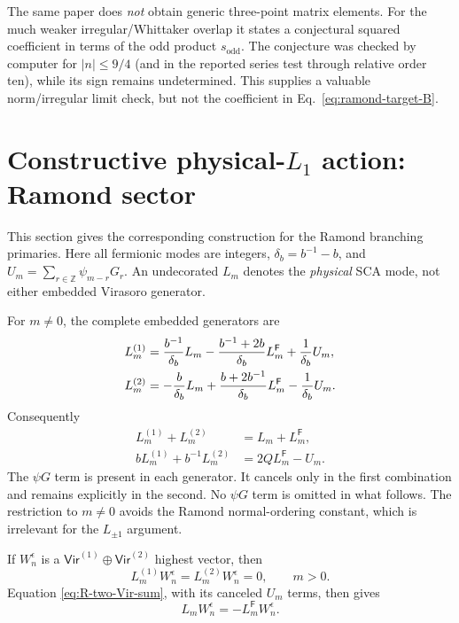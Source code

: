 \documentclass[11pt]{article}
\newcommand{\Ff}{\mathsf F}
\newcommand{\Vir}{\mathsf{Vir}}
\begin{document}
The same paper does \emph{not} obtain generic three-point matrix elements.
For the much weaker irregular/Whittaker overlap it states a conjectural
squared coefficient in terms of the odd product \(s_{\mathrm{odd}}\).  The
conjecture was checked by computer for \(\lvert n\rvert\leq9/4\) (and in the
reported series test through relative order ten), while its sign remains
undetermined.  This supplies a valuable norm/irregular limit check, but not
the coefficient in Eq.~\eqref{eq:ramond-target-B}.

\section{Constructive physical-\texorpdfstring{\(L_1\)}{L1} action:
Ramond sector}
\label{sec:constructive-physical-L1-R}

This section gives the corresponding construction for the Ramond branching
primaries.  Here all fermionic modes are integers,
\(\delta_b=b^{-1}-b\), and
\(U_m=\sum_{r\in\mathbb Z}\psi_{m-r}G_r\).  An undecorated \(L_m\) denotes the
\emph{physical} SCA mode, not either embedded Virasoro generator.

For \(m\ne0\), the complete embedded generators are
\begin{align}
 L_m^{(1)}
 &=\frac{b^{-1}}{\delta_b}L_m
   -\frac{b^{-1}+2b}{\delta_b}L_m^{\Ff}
   +\frac1{\delta_b}U_m,
 \notag\\
 L_m^{(2)}
 &=-\frac b{\delta_b}L_m
   +\frac{b+2b^{-1}}{\delta_b}L_m^{\Ff}
   -\frac1{\delta_b}U_m.
 \label{eq:R-two-Vir-U-explicit}
\end{align}
Consequently
\begin{align}
 L_m^{(1)}+L_m^{(2)}&=L_m+L_m^{\Ff},
 \label{eq:R-two-Vir-sum}\\
 bL_m^{(1)}+b^{-1}L_m^{(2)}&=2Q L_m^{\Ff}-U_m.
 \label{eq:R-two-Vir-weighted-sum}
\end{align}
The \(\psi G\) term is present in each generator.  It cancels only in the first
combination and remains explicitly in the second.  No \(\psi G\) term is omitted
in what follows.  The restriction to \(m\ne0\) avoids the Ramond
normal-ordering constant, which is irrelevant for the \(L_{\pm1}\) argument.

If \(W_n^\epsilon\) is a
\(\Vir^{(1)}\oplus\Vir^{(2)}\) highest vector, then
\begin{equation}
 L_m^{(1)}W_n^\epsilon=L_m^{(2)}W_n^\epsilon=0,
 \qquad m>0.
\end{equation}
Equation \eqref{eq:R-two-Vir-sum}, with its canceled \(U_m\) terms, then
gives
\begin{equation}
 L_mW_n^\epsilon=-L_m^{\Ff}W_n^\epsilon.
 \label{eq:physical-L-on-branch-primary}
\end{equation}
\end{document}
